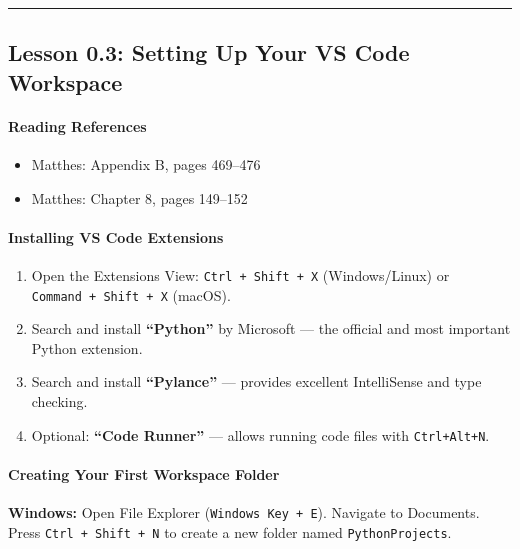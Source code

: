 \documentclass[
  justified,
  openright,
]{tufte-book}
\let\subsubsection\paragraph
\let\paragraph\paragraph
\let\subsubsection\paragraph
\let\paragraph\paragraph
\providecommand{\tightlist}{%
  \setlength{\itemsep}{0pt}\setlength{\parskip}{0pt}}
\begin{document}
\begin{center}\rule{0.5\linewidth}{0.5pt}\end{center}

\subsection{Lesson 0.3: Setting Up Your VS Code
Workspace}\label{lesson-0.3-setting-up-your-vs-code-workspace-1}

\subsubsection{Reading References}\label{reading-references-2}

\begin{itemize}
\tightlist
\item
  Matthes: Appendix B, pages 469--476
\item
  Matthes: Chapter 8, pages 149--152
\end{itemize}

\subsubsection{Installing VS Code
Extensions}\label{installing-vs-code-extensions}

\begin{enumerate}
\def\labelenumi{\arabic{enumi}.}
\tightlist
\item
  Open the Extensions View: \texttt{Ctrl\ +\ Shift\ +\ X}
  (Windows/Linux) or \texttt{Command\ +\ Shift\ +\ X} (macOS).
\item
  Search and install \textbf{``Python''} by Microsoft --- the official
  and most important Python extension.
\item
  Search and install \textbf{``Pylance''} --- provides excellent
  IntelliSense and type checking.
\item
  Optional: \textbf{``Code Runner''} --- allows running code files with
  \texttt{Ctrl+Alt+N}.
\end{enumerate}

\subsubsection{Creating Your First Workspace
Folder}\label{creating-your-first-workspace-folder}

\textbf{Windows:} Open File Explorer (\texttt{Windows\ Key\ +\ E}).
Navigate to Documents. Press \texttt{Ctrl\ +\ Shift\ +\ N} to create a
new folder named \texttt{PythonProjects}.
\end{document}
